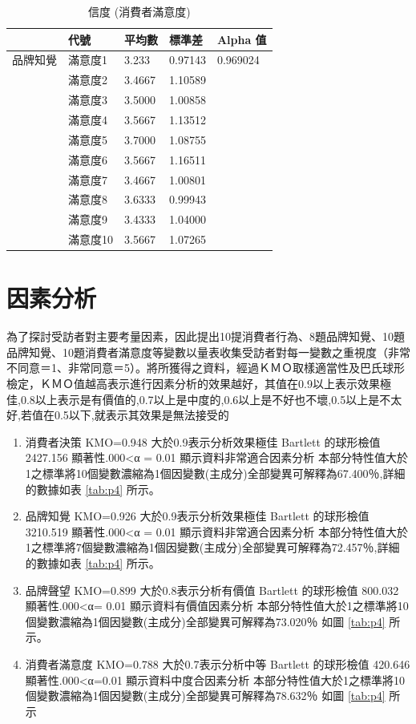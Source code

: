 \begin{table}[H]
\caption{信度 (消費者滿意度)}
\label{tab:e4}
\renewcommand{\arraystretch}{1.2} %
\arrayrulewidth=1pt               %
\tabcolsep=18pt                   %
\begin{tabular}[t]{lllll}  %
\hline
 & 代號& 平均數 & 標準差&  Alpha 值  \\
\hline
品牌知覺 & 滿意度1&3.233&0.97143&0.969024\\
              & 滿意度2&3.4667&1.10589&  \\
             & 滿意度3&3.5000&1.00858&  \\
             & 滿意度4&3.5667&1.13512&\\
             & 滿意度5&3.7000&1.08755&  \\
             & 滿意度6&3.5667&1.16511&\\
             & 滿意度7&3.4667&1.00801&  \\
             & 滿意度8&3.6333&0.99943&  \\
             & 滿意度9&3.4333&1.04000&\\
             & 滿意度10&3.5667&1.07265&\\
\hline
\end{tabular}
\end{table}

\section{因素分析}
為了探討受訪者對主要考量因素，因此提出10提消費者行為、8題品牌知覺、10題品牌知覺、10題消費者滿意度等變數以量表收集受訪者對每一變數之重視度（非常不同意＝1、非常同意＝5）。將所獲得之資料，經過ＫＭＯ取樣適當性及巴氏球形檢定，ＫＭＯ值越高表示進行因素分析的效果越好，其值在0.9以上表示效果極佳,0.8以上表示是有價值的,0.7以上是中度的,0.6以上是不好也不壞,0.5以上是不太好,若值在0.5以下,就表示其效果是無法接受的
\begin{enumerate}
\item 消費者決策
KMO=0.948 大於0.9表示分析效果極佳 Bartlett 的球形檢值 2427.156 顯著性.000<α = 0.01 顯示資料非常適合因素分析  本部分特性值大於1之標準將10個變數濃縮為1個因變數(主成分)全部變異可解釋為67.400％,詳細的數據如表  \ref{tab:p4} 所示。
\item 品牌知覺
KMO=0.926 大於0.9表示分析效果極佳 Bartlett 的球形檢值 3210.519 顯著性.000<α = 0.01 顯示資料非常適合因素分析  本部分特性值大於1之標準將7個變數濃縮為1個因變數(主成分)全部變異可解釋為72.457％,詳細的數據如表  \ref{tab:p4} 所示。
\item 品牌聲望
KMO=0.899 大於0.8表示分析有價值 Bartlett 的球形檢值 800.032 顯著性.000<α= 0.01 顯示資料有價值因素分析  本部分特性值大於1之標準將10個變數濃縮為1個因變數(主成分)全部變異可解釋為73.020％ 如圖 \ref{tab:p4}  所示。
\item 消費者滿意度
KMO=0.788 大於0.7表示分析中等 Bartlett 的球形檢值 420.646 顯著性.000<α=0.01 顯示資料中度合因素分析  本部分特性值大於1之標準將10個變數濃縮為1個因變數(主成分)全部變異可解釋為78.632％ 如圖 \ref{tab:p4} 所示
\end{enumerate}

